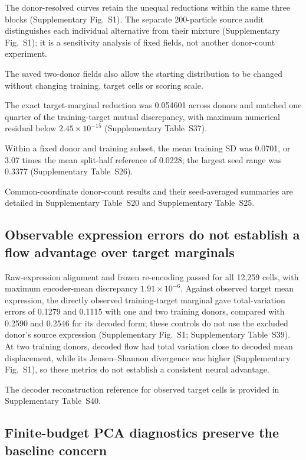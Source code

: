 \documentclass[10pt,a4paper]{article}
\begin{document}
The donor-resolved curves retain the unequal reductions within the same three blocks (Supplementary Fig.~S1). The separate 200-particle source audit distinguishes each individual alternative from their mixture (Supplementary Fig.~S1); it is a sensitivity analysis of fixed fields, not another donor-count experiment.

The saved two-donor fields also allow the starting distribution to be changed without changing training, target cells or scoring scale.

The exact target-marginal reduction was 0.054601 across donors and matched one quarter of the training-target mutual discrepancy, with maximum numerical residual below $2.45\times10^{-15}$ (Supplementary Table~S37).

Within a fixed donor and training subset, the mean training SD was 0.0701, or 3.07 times the mean split-half reference of 0.0228; the largest seed range was 0.3377 (Supplementary Table~S26).

Common-coordinate donor-count results and their seed-averaged summaries are detailed in Supplementary Table~S20 and Supplementary Table~S25.

\subsection{Observable expression errors do not establish a flow advantage over target marginals}

Raw-expression alignment and frozen re-encoding passed for all 12,259 cells, with maximum encoder-mean discrepancy $1.91\times10^{-6}$. Against observed target mean expression, the directly observed training-target marginal gave total-variation errors of 0.1279 and 0.1115 with one and two training donors, compared with 0.2590 and 0.2546 for its decoded form; these controls do not use the excluded donor's source expression (Supplementary Fig.~S1; Supplementary Table~S39). At two training donors, decoded flow had total variation close to decoded mean displacement, while its Jensen--Shannon divergence was higher (Supplementary Fig.~S1), so these metrics do not establish a consistent neural advantage.

The decoder reconstruction reference for observed target cells is provided in Supplementary Table~S40.

\subsection{Finite-budget PCA diagnostics preserve the baseline concern}
\end{document}
